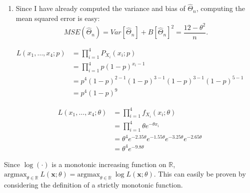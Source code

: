 \begin{problem}{3}
\begin{enumerate}
\item Since I have already computed the variance and bias of $\hat \Theta_n$, computing the mean squared error is easy:
\begin{equation*}
MSE(\hat \Theta_n) = Var[\hat \Theta_n]+B[\hat \Theta_n]^2 = \frac{12-\theta^2}{n}.
\end{equation*}

\end{enumerate}
\end{problem}

\begin{problem}{4}
\begin{align*}
L(x_1, \ldots, x_4;p) &= \prod_{i=1}^4 P_{X_i}(x_i;p) \\
& = \prod_{i=1}^4 p(1-p)^{x_i-1} \\
& = p^4(1-p)^{2-1}(1-p)^{3-1}(1-p)^{3-1}(1-p)^{5-1} \\
& = p^4(1-p)^{9}
\end{align*}

\end{problem}

\begin{problem}{5}
\begin{align*}
L(x_1, \ldots, x_4;\theta) &= \prod_{i=1}^4 f_{X_i}(x_i;\theta) \\
& = \prod_{i=1}^4 \theta e^{-\theta x_i} \\
& = \theta^4 e^{-2.35\theta }  e^{-1.55\theta } e^{-3.25\theta } e^{-2.65\theta } \\
& =\theta^4 e^{-9.8\theta } 
\end{align*}

\end{problem}

\begin{problem}{6} Since $\log(\cdot)$ is a monotonic increasing function on $\mathbb R$, $\mathrm{argmax}_{\theta \in \mathbb R}~L(\bm{x}; \theta) =\mathrm{argmax}_{\theta \in \mathbb R}~\log L(\bm x; \theta)$.  This can easily be proven by considering the definition of a strictly monotonic function.




\end{problem}




